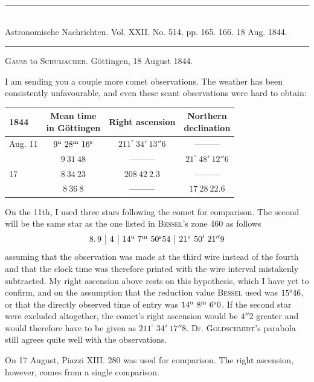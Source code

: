 \clearpage
{}
\hypertarget{native-472-lower}{}
\begin{center}
\rule{0.55\linewidth}{0.4pt}\\[2pt]
Astronomische Nachrichten. Vol. XXII. No. 514. pp. 165. 166. 18 Aug. 1844.\\[2pt]
\rule{0.55\linewidth}{0.4pt}
\end{center}
\begin{center}\textsc{Gauss} to \textsc{Schumacher}. Göttingen, 18 August 1844.\end{center}

I am sending you a couple more comet observations. The weather has been consistently unfavourable, and even these scant observations were hard to obtain:

\begin{center}
\setlength{\tabcolsep}{4pt}
\begin{tabular}{l|c|c|c}
1844 & \shortstack{Mean time\\in Göttingen} & Right ascension & \shortstack{Northern\\declination} \\\hline
Aug. 11 & $9^{\rm u}\ 28^{\rm m}\ 16^{\rm s}$ & $211^\circ\ 34'\ 13''6$ & ---\quad ---\quad --- \\
 & $9\ 31\ 48$ & ---\quad ---\quad --- & $21^\circ\ 48'\ 12''6$ \\
17 & $8\ 34\ 23$ & $208\ 42\ 2.3$ & ---\quad ---\quad --- \\
 & $8\ 36\ 8$ & ---\quad ---\quad --- & $17\ 28\ 22.6$ \\
\end{tabular}
\end{center}

On the 11th, I used three stars following the comet for comparison. The second will be the same star as the one listed in \textsc{Bessel}’s zone 460 as follows
\[
\begin{array}{c|c|c|c}
8.\,9 & 4 & 14^{\rm u}\ 7^{\rm m}\ 50^{\rm s}54 & 21^\circ\ 50'\ 21''9
\end{array}
\]
\noindent assuming that the observation was made at the third wire instead of the fourth and that the clock time was therefore printed with the wire interval mistakenly subtracted. My right ascension above rests on this hypothesis, which I have yet to confirm, and on the assumption that the reduction value \textsc{Bessel} used was $15^{\rm s}46$, or that the directly observed time of entry was $14^{\rm u}\ 8^{\rm m}\ 6^{\rm s}0$. If the second star were excluded altogether, the comet’s right ascension would be $4''2$ greater and would therefore have to be given as $211^\circ\ 34'\ 17''8$. Dr. \textsc{Goldschmidt}’s parabola still agrees quite well with the observations.

On 17 August, Piazzi XIII. 280 was used for comparison. The right ascension, however, comes from a single comparison.

